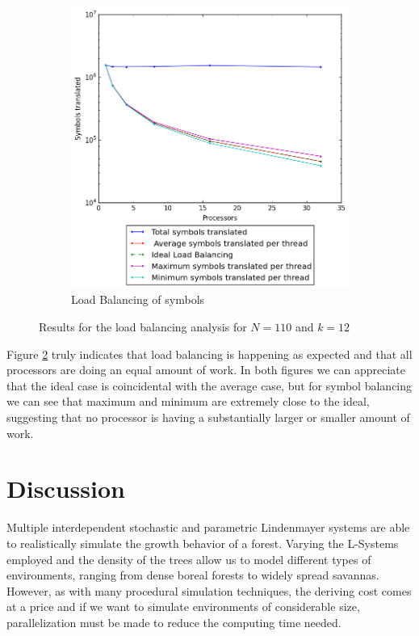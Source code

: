 \documentclass[letterpaper,twoside,11pt]{article}
\begin{document}
\begin{multicols}{2}
\begin{figure}
\begin{subfigure}{.5\textwidth}
    \includegraphics[width=.99\textwidth]{../3 Analysis/Load/symbolsnaive110.png}
    \caption{Load Balancing of symbols}
    \label{fig:Load_symbols}
  \end{subfigure}
  \caption{Results for the load balancing analysis for $N = 110$ and $k = 12$}
\end{figure}

\vfill
\columnbreak
Figure \ref{fig:Load_symbols} truly indicates that load balancing is happening as expected and that all processors are doing an equal amount of work. In both figures we can appreciate that the ideal case is coincidental with the average case, but for symbol balancing we can see that maximum and minimum are extremely close to the ideal, suggesting that no processor is having a substantially larger or smaller amount of work.



\section{Discussion} %
\label{sec:discussion}

Multiple interdependent stochastic and parametric Lindenmayer systems are able to realistically simulate the growth behavior of a forest. Varying the L-Systems employed and the density of the trees allow us to model different types of environments, ranging from dense boreal forests to widely spread savannas. However, as with many procedural simulation techniques, the deriving cost comes at a price and if we want to simulate environments of considerable size, parallelization must be made to reduce the computing time needed.


\end{multicols}
\end{document}
